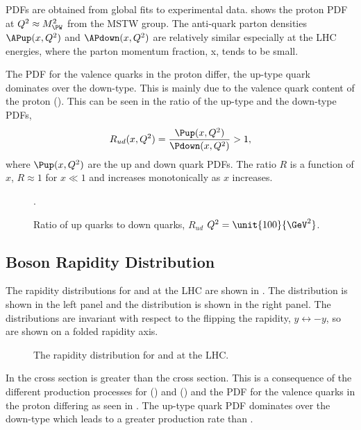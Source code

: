 \acp{PDF} are obtained
from global fits to experimental data.\cite{Martin:2009iq} %
 shows the proton PDF at $Q^2\approx M_{\PW}^2$ from the
MSTW group.
The anti-quark parton densities $\APup(x,Q^2)$ and $\APdown(x,Q^2)$ are
relatively similar especially at the LHC energies, where the parton momentum
fraction, x, tends to be small.

The \ac{PDF} for the valence quarks in the proton differ, the up-type quark
dominates over the down-type. This is mainly due to the valence quark content
of the proton (\HepProcess{\Pup\Pup\Pdown}).  This can be seen in the
ratio of the up-type and the down-type \acp{PDF},
\begin{equation}
  R_{ud}(x,Q^2) = \frac{\Pup(x,Q^2)}{ \Pdown(x,Q^2)} > 1,
\end{equation}
where $\Pup(x,Q^2)$ are the up and down quark \acp{PDF}.  
The ratio $R$ is a function of $x$, $R \approx 1$ for $x \ll 1$ and increases
monotonically as $x$ increases.  

\begin{figure}[htbp]
  \centering
  \caption{Ratio of up quarks to down quarks, $R_{ud}$ $ Q^2 = \unit{ 100  }{\GeV^2} $. }
  \label{fig:pdfrat}.
\end{figure}

\subsection{\PW Boson Rapidity Distribution}
\label{wbos:wrapsec}

The rapidity distributions for \PWp and \PWm at the \ac{LHC} are shown in
. 
The \PWm distribution is shown in the left panel and the \PWp distribution is
shown in the right panel. The distributions are invariant with respect to the
flipping the rapidity, $y\leftrightarrow-y$, so are shown on a folded rapidity
axis.

\begin{figure}[htbp]
  \centering
  \caption{The rapidity distribution for \PWp and \PWm at the LHC.}
  \label{wbos:wrapid}
\end{figure}

In  the \PWp cross section is greater than the \PWm
cross section. This is a consequence of the different production processes for
\PWp () and \PWm () and the
\ac{PDF} for the valence quarks in the proton differing as seen in
. The up-type quark \ac{PDF} dominates over the
down-type which leads to a greater \PWp production rate than \PWm.


